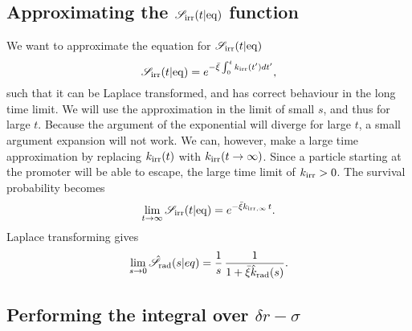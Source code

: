 \subsection{ Approximating the $\mathscr{S}_{\rm irr}(t|{\rm eq})$ function}
We want to approximate the equation for $\mathscr{S}_{\rm irr}(t|{\rm eq})$
\begin{equation}
 \mathscr{S}_{\rm irr}(t|{\rm eq}) = e^{-\bar{\xi}\int_0^t k_{{\rm irr}}(t') dt'},
\end{equation}
such that it can be Laplace transformed, and has correct behaviour in the long time limit. We will use the approximation in the limit of small $s$, and thus for large $t$. Because the argument of the exponential will diverge for large $t$, a small argument expansion will not work. We can, however, make a large time approximation by replacing $k_{{\rm irr}}(t)$ with $k_{{\rm irr}}(t \rightarrow \infty)$. Since a particle starting at the promoter will be able to escape, the large time limit of $k_{{\rm irr}}>0$. The survival probability becomes  
\begin{equation}
 \lim_{t \rightarrow \infty} \mathscr{S}_{\rm irr}(t|{\rm eq}) = e^{-\bar{\xi} k_{{\rm irr},\infty}\,t}.
\end{equation}
Laplace transforming gives
\begin{equation}
 \lim_{s \rightarrow 0} \hat{\mathscr{S}}_{\rm rad}(s|eq) = \frac{1}{s} \, \frac{1}{1 + \bar{\xi} \hat{k}_{\rm rad}(s)}.
\end{equation}

\subsection{ Performing the integral over $\delta{r-\sigma}$}


